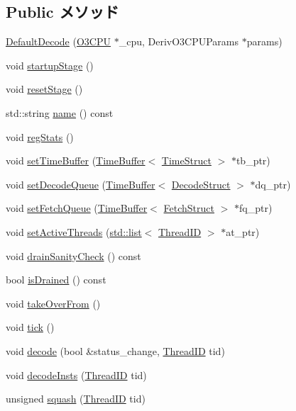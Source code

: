 \subsection*{Public メソッド}
\begin{DoxyCompactItemize}
\item 
\hyperlink{classDefaultDecode_a23f15d8a826761fea1106a071b97cf79}{DefaultDecode} (\hyperlink{classDefaultDecode_a44622cf06940413482836cb62931ac3f}{O3CPU} $\ast$\_\-cpu, DerivO3CPUParams $\ast$params)
\item 
void \hyperlink{classDefaultDecode_a31d4cbdab16d4ff8d6bc7f84ece727da}{startupStage} ()
\item 
void \hyperlink{classDefaultDecode_ada2a699094bc420f977abf2a17ed14c8}{resetStage} ()
\item 
std::string \hyperlink{classDefaultDecode_a37627d5d5bba7f4a8690c71c2ab3cb07}{name} () const 
\item 
void \hyperlink{classDefaultDecode_a4dc637449366fcdfc4e764cdf12d9b11}{regStats} ()
\item 
void \hyperlink{classDefaultDecode_a2b521ea5f191fff72265f60d4ed5187b}{setTimeBuffer} (\hyperlink{classTimeBuffer}{TimeBuffer}$<$ \hyperlink{structTimeStruct}{TimeStruct} $>$ $\ast$tb\_\-ptr)
\item 
void \hyperlink{classDefaultDecode_a21f95db13a2fc05d7a5fcc43fec1f1e7}{setDecodeQueue} (\hyperlink{classTimeBuffer}{TimeBuffer}$<$ \hyperlink{classDefaultDecode_a38077cd156cf219016abf92d8c5b523b}{DecodeStruct} $>$ $\ast$dq\_\-ptr)
\item 
void \hyperlink{classDefaultDecode_ad1be90519aa7737ddf8e41de079a5ea9}{setFetchQueue} (\hyperlink{classTimeBuffer}{TimeBuffer}$<$ \hyperlink{classDefaultDecode_a3aac8607069f16898ef53cfaa2d97aeb}{FetchStruct} $>$ $\ast$fq\_\-ptr)
\item 
void \hyperlink{classDefaultDecode_aab96bdacf8bd420402cbb543f994e054}{setActiveThreads} (\hyperlink{classstd_1_1list}{std::list}$<$ \hyperlink{base_2types_8hh_ab39b1a4f9dad884694c7a74ed69e6a6b}{ThreadID} $>$ $\ast$at\_\-ptr)
\item 
void \hyperlink{classDefaultDecode_a0240eb42fa57fe5d3788093f62b77347}{drainSanityCheck} () const 
\item 
bool \hyperlink{classDefaultDecode_adf5473c18a3d7c1e88c4a2072bce5526}{isDrained} () const 
\item 
void \hyperlink{classDefaultDecode_a8674059ce345e23aac5086b2c3e24a43}{takeOverFrom} ()
\item 
void \hyperlink{classDefaultDecode_a873dd91783f9efb4a590aded1f70d6b0}{tick} ()
\item 
void \hyperlink{classDefaultDecode_a9632c526b9379a21d93cf2021090f194}{decode} (bool \&status\_\-change, \hyperlink{base_2types_8hh_ab39b1a4f9dad884694c7a74ed69e6a6b}{ThreadID} tid)
\item 
void \hyperlink{classDefaultDecode_a1a947755eba94aa1142e3b47068e5eee}{decodeInsts} (\hyperlink{base_2types_8hh_ab39b1a4f9dad884694c7a74ed69e6a6b}{ThreadID} tid)
\item 
unsigned \hyperlink{classDefaultDecode_a44313b71f53a0366212ed600d2d0b11d}{squash} (\hyperlink{base_2types_8hh_ab39b1a4f9dad884694c7a74ed69e6a6b}{ThreadID} tid)
\end{DoxyCompactItemize}
